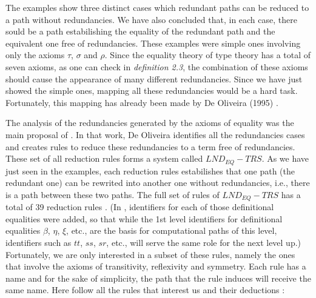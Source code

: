 \documentclass{entcs} \usepackage{entcsmacro}
\begin{document}
The examples show three distinct cases which redundant paths can be reduced to a path without redundancies. We have also concluded that, in each case, there sould be a path estabilishing the equality of the redundant path and the equivalent one free of redundancies. These examples were simple ones involving only the axioms $\tau$, $\sigma$ and $\rho$. Since the equality theory of type theory has a total of seven axioms, as one can check in \emph{definition 2.3}, the combination of these axioms should cause the appearance of many different redundancies. Since we have just showed the simple ones, mapping all these redundancies would be a hard task. Fortunately, this mapping has already been made by De Oliveira (1995) \cite{Anjo1}.

The analysis of the redundancies generated by the axioms of equality was the main proposal of \cite{Anjo1}. In that work, De Oliveira identifies all the redundancies cases and creates rules to reduce these redundancies to a term free of redundancies. These set of all reduction rules forms a system called $LND_{EQ}-TRS$. As we have just seen in the examples, each reduction rules estabilishes that one path (the redundant one) can be rewrited into another one without redundancies, i.e., there is a path between these two paths. The full set of rules of $LND_{EQ}-TRS$ has a total of 39 reduction rules \cite{Anjo1}. (In \cite{Ruy1}, identifiers for each of those definitional equalities were added, so that while the 1st level identifiers for definitional equalities $\beta$, $\eta$, $\xi$, etc., are the basis for computational paths of this level, identifiers such as $tt$, $ss$, $sr$, etc., will serve the same role for the next level up.) Fortunately, we are only interested in a subset of these rules, namely the ones that involve the axioms of transitivity, reflexivity and symmetry. Each rule has a name and for the sake of simplicity, the path that the rule induces will receive the same name. Here follow all the rules that interest us and their deductions \cite{Anjo1}:
\end{document}
